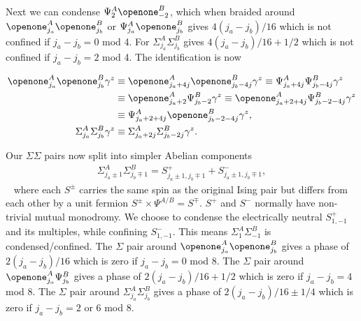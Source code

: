 Next we can condense $\Psi^A_{2}\openone^B_{-2}$, which when braided around $\openone^A_{j_a}\openone^B_{j_b}$ or $\Psi^A_{j_a}\openone^B_{j_b}$  gives $4(j_a-j_b)/16$ which is not confined if $j_a-j_b=0$ mod 4. For $\Sigma^A_{j_a}\Sigma^B_{j_b}$  gives $4(j_a-j_b)/16+1/2$ which is not confined if $j_a-j_b=2$ mod 4. The identification is now

\begin{align*}
\openone^A_{j_a}\openone^B_{j_b}\gamma^z&\equiv\openone^A_{j_a+4j}\openone^B_{j_b-4j}\gamma^z\equiv\Psi^A_{j_a+4j}\Psi^B_{j_b-4j}\gamma^z\\ &\equiv\openone^A_{j_a+2}\Psi^B_{j_b-2}\gamma^z\equiv\openone^A_{j_a+2+4j}\Psi^B_{j_b-2-4j}\gamma^z 
\\&\equiv\Psi^A_{j_a+2+4j}\openone^B_{j_b-2-4j}\gamma^z, \\
\Sigma^A_{j_a}\Sigma^B_{j_b}\gamma^z&\equiv\Sigma^A_{j_a+2j}\Sigma^B_{j_b-2j}\gamma^z.
\end{align*}

Our $\Sigma \Sigma$ pairs now split into simpler Abelian components
\
\begin{align}\Sigma^A_{j_a\pm1}\Sigma^B_{j_b\mp1}=S^+_{j_a\pm1,j_b\mp1}+S^-_{j_a\pm1,j_b\mp1},\end{align}
\
\noindent
where each $S^\pm$ carries the same spin as the original Ising pair but differs from each other by a unit fermion $S^\pm\times\Psi^{A/B}=S^\mp$. $S^+$ and $S^-$ normally have non-trivial mutual monodromy. We choose to condense the electrically neutral $S^+_{1,-1}$ and its multiples, while confining  $S^-_{1,-1}$. This means $\Sigma^A_{1}\Sigma^B_{-1}$ is condensed/confined. The $\Sigma$ pair around $\openone^A_{j_a}\openone^B_{j_b}$ gives a phase of $2(j_a-j_b)/16$ which is zero if $j_a-j_b=0$ mod 8. The $\Sigma$ pair around $\openone^A_{j_a}\Psi^B_{j_b}$ gives a phase of $2(j_a-j_b)/16+1/2$ which is zero if $j_a-j_b=4$ mod 8. The $\Sigma$ pair around $\Sigma^A_{j_a}\Sigma^B_{j_b}$ gives a phase of $2(j_a-j_b)/16\pm1/4$ which is zero if $j_a-j_b=2$ or $6$ mod 8.



